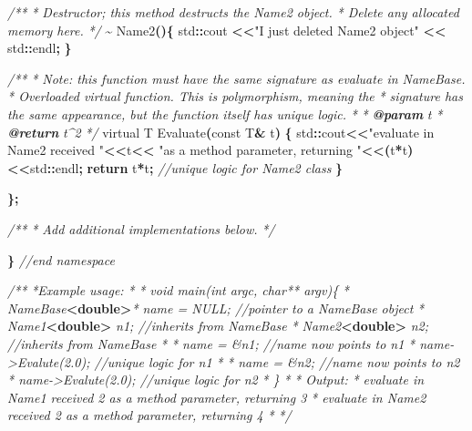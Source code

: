 \documentclass[
]{book}
\newenvironment{Shaded}{\begin{snugshade}}{\end{snugshade}}
\newcommand{\AnnotationTok}[1]{\textcolor[rgb]{0.56,0.35,0.01}{\textbf{\textit{#1}}}}
\newcommand{\CommentTok}[1]{\textcolor[rgb]{0.56,0.35,0.01}{\textit{#1}}}
\newcommand{\ControlFlowTok}[1]{\textcolor[rgb]{0.13,0.29,0.53}{\textbf{#1}}}
\newcommand{\DataTypeTok}[1]{\textcolor[rgb]{0.13,0.29,0.53}{#1}}
\newcommand{\KeywordTok}[1]{\textcolor[rgb]{0.13,0.29,0.53}{\textbf{#1}}}
\newcommand{\NormalTok}[1]{#1}
\newcommand{\OperatorTok}[1]{\textcolor[rgb]{0.81,0.36,0.00}{\textbf{#1}}}
\newcommand{\StringTok}[1]{\textcolor[rgb]{0.31,0.60,0.02}{#1}}
\begin{document}
\begin{Shaded}
\begin{Highlighting}[]
 
  \CommentTok{/**}
\CommentTok{   * Destructor; this method destructs the Name2 object.}
\CommentTok{   * Delete any allocated memory here.}
\CommentTok{   */}
  \OperatorTok{\textasciitilde{}}\NormalTok{ Name2}\OperatorTok{()\{}
\NormalTok{    std}\OperatorTok{::}\NormalTok{cout }\OperatorTok{\textless{}\textless{}}\StringTok{"I just deleted Name2 object"} \OperatorTok{\textless{}\textless{}}\NormalTok{ std}\OperatorTok{::}\NormalTok{endl}\OperatorTok{;}
  \OperatorTok{\}}
  
   \CommentTok{/**}
\CommentTok{    * Note: this function must have the same signature as evaluate in NameBase.}
\CommentTok{    * Overloaded virtual function. This is polymorphism, meaning the }
\CommentTok{    * signature has the same appearance, but the function itself has unique logic.}
\CommentTok{    * }
\CommentTok{    * }\AnnotationTok{@param}\CommentTok{ t}
\CommentTok{    * }\AnnotationTok{@return}\CommentTok{ t\^{}2}
\CommentTok{    */}
\NormalTok{   virtual T Evaluate}\OperatorTok{(}\DataTypeTok{const}\NormalTok{ T}\OperatorTok{\&}\NormalTok{ t}\OperatorTok{)} \OperatorTok{\{}
\NormalTok{     std}\OperatorTok{::}\NormalTok{cout}\OperatorTok{\textless{}\textless{}}\StringTok{"evaluate in Name2 received "}\OperatorTok{\textless{}\textless{}}\NormalTok{t}\OperatorTok{\textless{}\textless{}}
     \StringTok{"as a method parameter, returning "}\OperatorTok{\textless{}\textless{}(}\NormalTok{t}\OperatorTok{*}\NormalTok{t}\OperatorTok{)\textless{}\textless{}}\NormalTok{std}\OperatorTok{::}\NormalTok{endl}\OperatorTok{;}
     \ControlFlowTok{return}\NormalTok{ t}\OperatorTok{*}\NormalTok{t}\OperatorTok{;} \CommentTok{//unique logic for Name2 class}
   \OperatorTok{\}}

\OperatorTok{\};}
  
\CommentTok{/**}
\CommentTok{ * Add additional implementations below.}
\CommentTok{ */}
  



\OperatorTok{\}} \CommentTok{//end namespace}

\CommentTok{/**}
\CommentTok{ *Example usage:}
\CommentTok{ *}
\CommentTok{ * void main(int argc, char** argv)\{}
\CommentTok{ *    NameBase}\KeywordTok{\textless{}double\textgreater{}}\CommentTok{* name = NULL; //pointer to a NameBase object}
\CommentTok{ *    Name1}\KeywordTok{\textless{}double\textgreater{}}\CommentTok{ n1; //inherits from NameBase}
\CommentTok{ *    Name2}\KeywordTok{\textless{}double\textgreater{}}\CommentTok{ n2; //inherits from NameBase}
\CommentTok{ *}
\CommentTok{ *    name = \&n1; //name now points to n1}
\CommentTok{ *    name{-}\textgreater{}Evalute(2.0); //unique logic for n1}
\CommentTok{ *}
\CommentTok{ *    name = \&n2; //name now points to n2}
\CommentTok{ *    name{-}\textgreater{}Evalute(2.0); //unique logic for n2}
\CommentTok{ * \}}
\CommentTok{ *}
\CommentTok{ * Output:}
\CommentTok{ * evaluate in Name1 received 2 as a method parameter, returning 3}
\CommentTok{ * evaluate in Name2 received 2 as a method parameter, returning 4}
\CommentTok{ *}
\CommentTok{ */}




\end{Highlighting}
\end{Shaded}
\end{document}
